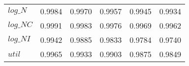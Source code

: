 \begin{center}
\begin{longtable}{lccccc}
$log\_N          $	 & 	     0.9984	 & 	     0.9970	 & 	     0.9957	 & 	     0.9945	 & 	     0.9934 \\ 
$log\_NC         $	 & 	     0.9991	 & 	     0.9983	 & 	     0.9976	 & 	     0.9969	 & 	     0.9962 \\ 
$log\_NI         $	 & 	     0.9942	 & 	     0.9885	 & 	     0.9833	 & 	     0.9784	 & 	     0.9740 \\ 
${util}          $	 & 	     0.9965	 & 	     0.9933	 & 	     0.9903	 & 	     0.9875	 & 	     0.9849 \\ 
\end{longtable}
 \end{center}
